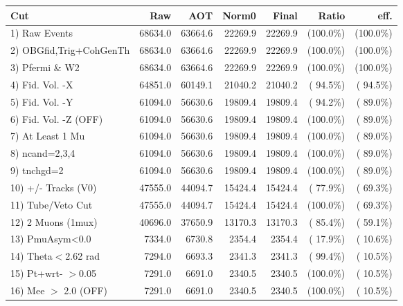  \begin{table}[h!]\centering
 \begin{tabular}{||l||r|r|r|r|r|r||}
 \hline
 \hline
 Cut & Raw & AOT & Norm0 & Final & Ratio & eff.       \\
 \hline
  1) Raw Events           &      68634.0 &      63664.6 &      22269.9 &      22269.9 & (100.0\%) & (100.0\%) \\
  2) OBGfid,Trig+CohGenTh &      68634.0 &      63664.6 &      22269.9 &      22269.9 & (100.0\%) & (100.0\%) \\
  3) Pfermi \& W2         &      68634.0 &      63664.6 &      22269.9 &      22269.9 & (100.0\%) & (100.0\%) \\
  4) Fid. Vol. -X         &      64851.0 &      60149.1 &      21040.2 &      21040.2 & ( 94.5\%) & ( 94.5\%) \\
  5) Fid. Vol. -Y         &      61094.0 &      56630.6 &      19809.4 &      19809.4 & ( 94.2\%) & ( 89.0\%) \\
  6) Fid. Vol. -Z (OFF)   &      61094.0 &      56630.6 &      19809.4 &      19809.4 & (100.0\%) & ( 89.0\%) \\
  7) At Least 1 Mu        &      61094.0 &      56630.6 &      19809.4 &      19809.4 & (100.0\%) & ( 89.0\%) \\
  8) ncand=2,3,4          &      61094.0 &      56630.6 &      19809.4 &      19809.4 & (100.0\%) & ( 89.0\%) \\
  9) tnchgd=2             &      61094.0 &      56630.6 &      19809.4 &      19809.4 & (100.0\%) & ( 89.0\%) \\
 10) +/- Tracks (V0)      &      47555.0 &      44094.7 &      15424.4 &      15424.4 & ( 77.9\%) & ( 69.3\%) \\
 11) Tube/Veto Cut        &      47555.0 &      44094.7 &      15424.4 &      15424.4 & (100.0\%) & ( 69.3\%) \\
 12) 2 Muons (1mux)       &      40696.0 &      37650.9 &      13170.3 &      13170.3 & ( 85.4\%) & ( 59.1\%) \\
 13) PmuAsym<0.0          &       7334.0 &       6730.8 &       2354.4 &       2354.4 & ( 17.9\%) & ( 10.6\%) \\
 14) Theta$<$2.62 rad     &       7294.0 &       6693.3 &       2341.3 &       2341.3 & ( 99.4\%) & ( 10.5\%) \\
 15) Pt+wrt- $>$0.05      &       7291.0 &       6691.0 &       2340.5 &       2340.5 & (100.0\%) & ( 10.5\%) \\
 16) Mee $>$ 2.0  (OFF)   &       7291.0 &       6691.0 &       2340.5 &       2340.5 & (100.0\%) & ( 10.5\%) \\

\end{tabular}
\end{table}
